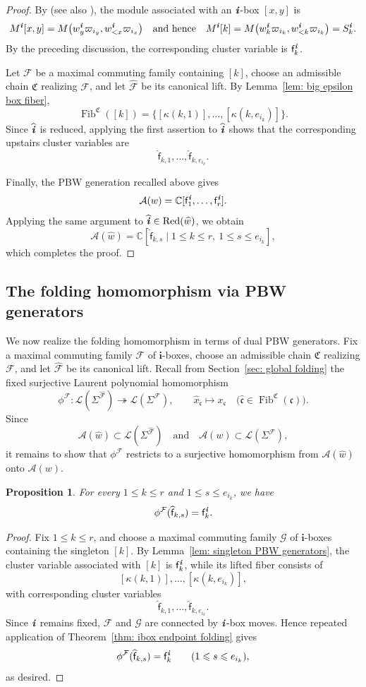 \documentclass[12pt, leqno]{amsart}
\numberwithin{equation}{section}
\theoremstyle{plain}
\newtheorem{proposition}[lemma]{Proposition}
\theoremstyle{definition}
\renewcommand{\le}{\leqslant}
\newcommand{\C}{\mathbb{C}}
\newcommand{\ii}{ \textbf{\textit{i}}}
\newcommand{\Fib}{\operatorname{Fib}}
\newcommand{\hw}{\widehat{w}}
\newcommand{\hx}{\widehat{x}}
\newcommand{\hii}{{\widehat{\ii}}}
\newcommand{\frakC}{\mathfrak{C}}
\newcommand{\frakc}{\mathfrak{c}}
\newcommand{\hfrakc}{\widehat{\frakc}}
\newcommand{\sff}{\mathsf{f}}
\newcommand{\hsff}{\widehat{\sff}}
\newcommand{\bfi}{\mathbf{i}}
\newcommand{\calA}{\mathcal{A}}
\newcommand{\calF}{\mathcal{F}}
\newcommand{\calG}{\mathcal{G}}
\newcommand{\calL}{\mathcal{L}}
\newcommand{\hcalF}{{\widehat{\calF}}}
\newcommand{\qtq}[1][{and}]{\quad\text{{#1}}\quad}
\newcommand{\qtqh}[1][{and hence}]{\quad\text{{#1}}\quad}
\newcommand{\Red}{\mathrm{Red}}
\begin{document}
\begin{proof}
By \cite{KKOP18} (see also \cite[Section~5.1]{KK24}), the module associated with an
$\ii$-box $[x,y]$ is
\[
M^\ii[x,y] = M\bigl(w_y^\ii\varpi_{i_y}, w_{<x}^\ii\varpi_{i_x}\bigr)
\qtqh
M^\ii[k] = M\bigl(w_k^\ii\varpi_{i_k}, w_{<k}^\ii\varpi_{i_k}\bigr) = S_k^\ii.
\]
By the preceding discussion, the corresponding cluster variable is
$\sff_k^\ii$.

Let $\calF$ be a maximal commuting family containing $[k]$, choose an
admissible chain $\frakC$ realizing $\calF$, and let $\hcalF$ be its
canonical lift. By
Lemma~\ref{lem: big epsilon box fiber},
\[
\Fib^\frakC([k]) = \bigl\{ [\kappa(k,1)],\ldots,[\kappa(k,e_{i_k})] \bigr\}.
\]
Since $\hii$ is reduced, applying the first assertion to $\hii$ shows
that the corresponding upstairs cluster variables are
\[
\hsff_{k,1},\ldots,\hsff_{k,e_{i_k}}.
\]

Finally, the PBW generation recalled above gives
\[
\calA(w) = \C[\sff_1^\ii,\ldots,\sff_r^\ii].
\]
Applying the same argument to $\hii\in\Red(\hw)$, we obtain
\[
\calA(\hw) = \C[\hsff_{k,s}\mid 1\le k\le r,\ 1\le s\le e_{i_k}],
\]
which completes the proof.
\end{proof}

\subsection{The folding homomorphism via PBW generators}

We now realize the folding homomorphism in terms of dual PBW
generators.  Fix a maximal commuting family $\calF$ of
$\bfi$-boxes, choose an admissible chain $\frakC$ realizing $\calF$,
and let $\hcalF$ be its canonical lift.
Recall from Section~\ref{sec: global folding} the fixed surjective Laurent polynomial
homomorphism
\[
\phi^\calF: \calL(\Sigma^{\hcalF}) \twoheadrightarrow \calL(\Sigma^\calF),
\qquad
\hx_{\hfrakc}\longmapsto x_\frakc
\quad
\bigl(\hfrakc\in\Fib^\frakC(\frakc)\bigr).
\]
Since
\[
\calA(\hw)\subset\calL(\Sigma^{\hcalF}) \qtq \calA(w)\subset\calL(\Sigma^\calF),
\]
it remains to show that $\phi^\calF$ restricts to a surjective
homomorphism from $\calA(\hw)$ onto $\calA(w)$.

\begin{proposition}\label{prop: folding PBW generators}
For every $1\le k\le r$ and $1\le s\le e_{i_k}$, we have
\[
\phi^\calF(\hsff_{k,s})=\sff_k^\ii.
\]
\end{proposition}

\begin{proof}
Fix $1\le k\le r$, and choose a maximal commuting family $\calG$
of $\bfi$-boxes containing the singleton $[k]$.  By
Lemma~\ref{lem: singleton PBW generators}, the cluster variable
associated with $[k]$ is $\sff_k^\ii$, while its lifted fiber consists
of
\[
[\kappa(k,1)],\ldots,[\kappa(k,e_{i_k})],
\]
with corresponding cluster variables
\[
\hsff_{k,1},\ldots,\hsff_{k,e_{i_k}}.
\]
Since $\ii$ remains fixed, $\calF$ and $\calG$ are connected by
$\ii$-box moves. Hence repeated application of
Theorem~\ref{thm: ibox endpoint folding} gives
\[
\phi^\calF(\hsff_{k,s})=\sff_k^\ii \qquad (1\le s\le e_{i_k}),
\]
as desired.
\end{proof}
\end{document}

